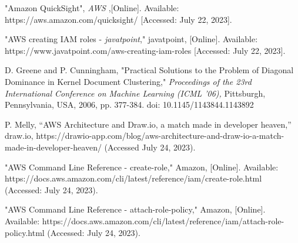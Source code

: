 \begin{sloppypar}
\begin{enumerate}[label={[\arabic*]}]
    \item "Amazon QuickSight", \textit{AWS} ,[Online]. Available: https://aws.amazon.com/quicksight/ [Accessed: July 22, 2023].

    \item "AWS creating IAM roles - \textit{javatpoint}," javatpoint, [Online]. Available: https://www.javatpoint.com/aws-creating-iam-roles [Accessed: July 22, 2023].


    \item D. Greene and P. Cunningham, "Practical Solutions to the Problem of Diagonal Dominance in Kernel Document Clustering,"  \textit{Proceedings of the 23rd International Conference on Machine Learning (ICML '06),} Pittsburgh, Pennsylvania, USA, 2006, pp. 377-384. doi: 10.1145/1143844.1143892

    \item P. Melly, “AWS Architecture and Draw.io, a match made in developer heaven,” draw.io, https://drawio-app.com/blog/aws-architecture-and-draw-io-a-match-made-in-developer-heaven/ (Accessed July 24, 2023). 

    \item "AWS Command Line Reference - create-role," Amazon, [Online]. Available:   https://docs.aws.amazon.com/cli/latest/reference/iam/create-role.html (Accessed: July 24, 2023).
    
    \item "AWS Command Line Reference - attach-role-policy," Amazon, [Online]. Available: https://docs.aws.amazon.com/cli/latest/reference/iam/attach-role-policy.html (Accessed: July 24, 2023).
  \end{enumerate}

\end{sloppypar}
\newpage


